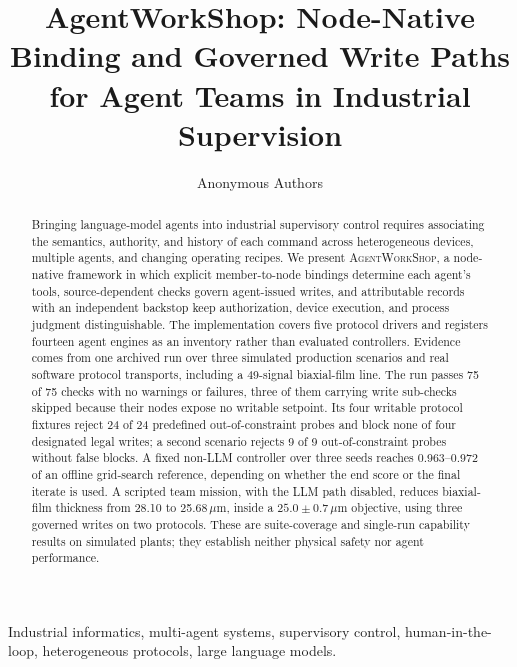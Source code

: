 \documentclass[journal]{IEEEtran}
\newcommand{\system}{\textsc{AgentWorkShop}}
\begin{document}
\title{AgentWorkShop: Node-Native Binding and Governed Write Paths for Agent Teams in Industrial Supervision}

\author{Anonymous Authors}

\maketitle

\begin{abstract}
Bringing language-model agents into industrial supervisory control requires
associating the semantics, authority, and history of each command across
heterogeneous devices, multiple agents, and changing operating recipes. We
present \system{}, a node-native framework in which explicit member-to-node
bindings determine each agent's tools, source-dependent checks govern
agent-issued writes, and attributable records with an independent backstop
keep authorization, device execution, and process judgment distinguishable.
The implementation covers five protocol drivers and registers fourteen agent
engines as an inventory rather than evaluated controllers. Evidence comes from
one archived run over three simulated production scenarios and real software
protocol transports, including a 49-signal biaxial-film line. The run passes 75 of 75 checks with no warnings or failures, three of them carrying write sub-checks skipped because their nodes expose no writable setpoint. Its four writable protocol fixtures
reject 24 of 24 predefined out-of-constraint probes and block none of four
designated legal writes; a second scenario rejects 9 of 9 out-of-constraint probes without false blocks. A fixed non-LLM controller over three seeds reaches
0.963--0.972 of an offline grid-search reference, depending on whether the end
score or the final iterate is used. A scripted team mission, with the LLM path
disabled, reduces biaxial-film thickness from 28.10 to 25.68\,$\mu$m, inside a
$25.0\pm0.7\,\mu$m objective, using three governed writes on two protocols. These
are suite-coverage and single-run capability results on simulated plants; they
establish neither physical safety nor agent performance.
\end{abstract}

\begin{IEEEkeywords}
Industrial informatics, multi-agent systems, supervisory control, human-in-the-loop, heterogeneous protocols, large language models.
\end{IEEEkeywords}

\IEEEpeerreviewmaketitle










\end{document}
